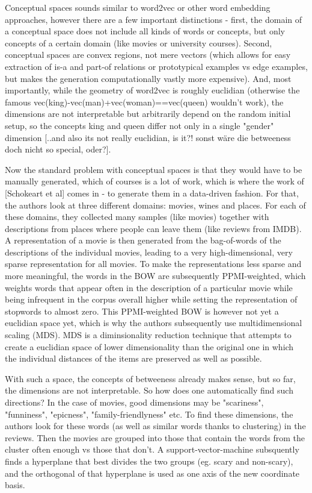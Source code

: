 Conceptual spaces sounds similar to \gls{word2vec} or other word embedding approaches, however there are a few important distinctions - first, the domain of a conceptual space does not include all kinds of words or concepts, but only concepts of a certain domain (like movies or university courses). 
Second, conceptual spaces are convex regions, not mere vectors (which allows for easy extraction of is-a and part-of relations or prototypical examples vs edge examples, but makes the generation computationally vastly more expensive). And, most importantly, while the geometry of \gls{word2vec} is roughly euclidian (otherwise the famous vec(king)-vec(man)+vec(woman)==vec(queen) wouldn't work), the dimensions are not interpretable but arbitrarily depend on the random initial setup, so the concepts king and queen differ not only in a single "gender" dimension [..and also its not really euclidian, is it?! sonst wäre die betweeness doch nicht so special, oder?].

Now the standard problem with conceptual spaces is that they would have to be manually generated, which of courses is a lot of work, which is where the work of [Schokeart et al] comes in - to generate them in a data-driven fashion.
For that, the authors look at three different domains: movies, wines and places. For each of these domains, they collected many samples (like movies) together with descriptions from places where people can leave them (like reviews from IMDB). A representation of a movie is then generated from the bag-of-words of the descriptions of the individual movies, leading to a very high-dimensional, very sparse representation for all movies. 
To make the representations less sparse and more meaningful, the words in the BOW are subsequently PPMI-weighted, which weights words that appear often in the description of a particular movie while being infrequent in the corpus overall higher while setting the representation of stopwords to almost zero. 
This PPMI-weighted BOW is however not yet a euclidian space yet, which is why the authors subsequently use multidimensional scaling (MDS). MDS is a diminsionality reduction technique that attempts to create a euclidian space of lower dimensionality than the original one in which the individual distances of the items are preserved as well as possible. 

With such a space, the concepts of betweeness already makes sense, but so far, the dimensions are not interpretable. So how does one automatically find such directions? In the case of movies, good dimensions may be "scariness", "funniness", "epicness", "family-friendlyness" etc. 
To find these dimensions, the authors look for these words (as well as similar words thanks to clustering) in the reviews. Then the movies are grouped into those that contain the words from the cluster often enough vs those that don't. A support-vector-machine subsquently finds a hyperplane that best divides the two groups (eg. scary and non-scary), and the orthogonal of that hyperplane is used as one axis of the new coordinate basis. 

